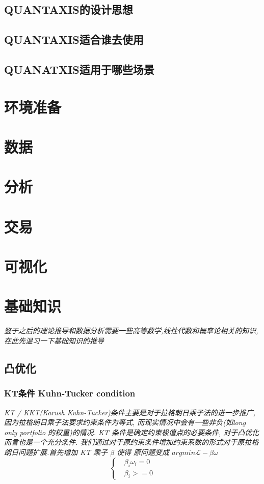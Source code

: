 \documentclass{scrartcl}
\numberwithin{equation}{section}
\begin{document}
\subsection{QUANTAXIS的设计思想}

\subsection{QUANTAXIS适合谁去使用}

\subsection{QUANATXIS适用于哪些场景}

\newpage
\section{环境准备}

\newpage
\section{数据}

\newpage
\section{分析}
\newpage
\section{交易}
\newpage
\section{可视化}
\newpage


  
\newpage
\section{基础知识}
\textsl{
    鉴于之后的理论推导和数据分析需要一些高等数学,线性代数和概率论相关的知识, 在此先温习一下基础知识的推导
}
\subsection{凸优化}
\subsubsection{KT条件 Kuhn-Tucker condition}
\textsl{
    KT / KKT(Karush Kuhn-Tucker)条件主要是对于拉格朗日乘子法的进一步推广, 因为拉格朗日乘子法要求约束条件为等式, 而现实情况中会有一些非负(如long only portfolio 的权重)的情况. KT 条件是确定约束极值点的必要条件, 对于凸优化而言也是一个充分条件. 我们通过对于原约束条件增加约束系数的形式对于原拉格朗日问题扩展.首先增加 KT 乘子 $\beta $ 使得 原问题变成 $ argmin \mathcal{L} - \beta \omega $
}
\begin{equation}
    \left\{
    \begin{array}{lr}
         & \beta_i \omega_i =0 \\ & \beta_i >=0
    \end{array}
    \right.
\end{equation}
\end{document}
